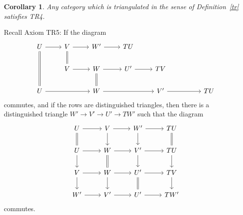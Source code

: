 \documentclass[12pt]{article}
\newtheorem{cor}[thm]{Corollary}
\theoremstyle{remark}
\theoremstyle{definition}
\begin{document}
\begin{cor}\label{may}
Any category which is triangulated in the sense of Definition~\ref{tr} satisfies {\em TR4}.
\end{cor} 

Recall Axiom TR5: If the diagram 
$$
\begin{tikzcd}
U\ar[equal]{dd}\ar{r}&V\ar[equal]{d}\ar{r}&W'\ar{r}&TU\\
&V\ar{r}&W\ar[equal]{d}\ar{r}&U'\ar{r}&TV\\
U\ar{rr}&&W\ar{rr}&&V'\ar{rr}&&TU
\end{tikzcd}
$$
commutes, and if the rows are distinguished triangles, then there is a distinguished triangle $W'\to V'\to U'\to TW'$ such that the diagram 
$$
\begin{tikzcd}
U\ar{r}\ar[equal]{d}&V\ar{d}\ar{r}&W'\ar{d}\ar{r}&TU\ar[equal]{d}\\
U\ar{d}\ar{r}&W\ar{r}\ar[equal]{d}&V'\ar{d}\ar{r}&TU\ar{d}\\
V\ar{d}\ar{r}&W\ar{d}\ar{r}&U'\ar{r}\ar[equal]{d}&TV\ar{d}\\
W'\ar{r}&V'\ar{r}&U'\ar{r}&TW' 
\end{tikzcd}
$$ 
commutes. 
\end{document}

